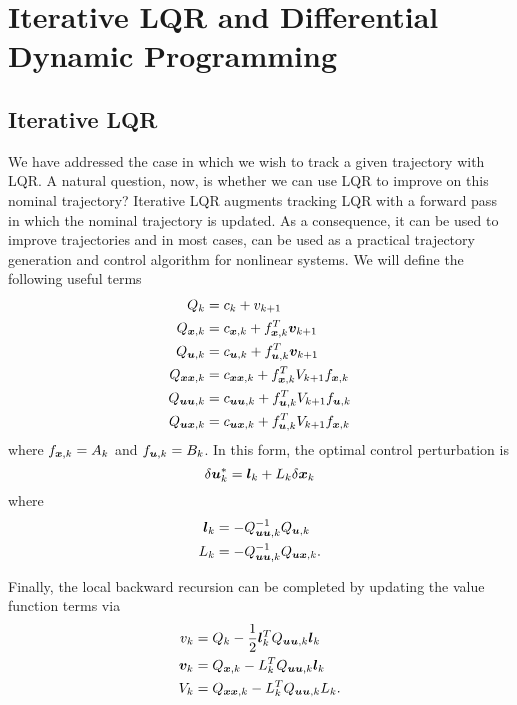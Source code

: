 \section{Iterative LQR and Differential Dynamic Programming}

\subsection{Iterative LQR}

We have addressed the case in which we wish to track a given trajectory with LQR. A natural question, now, is whether we can use LQR to improve on this nominal trajectory? Iterative LQR augments tracking LQR with a forward pass in which the nominal trajectory is updated. As a consequence, it can be used to improve trajectories and in most cases, can be used as a practical trajectory generation and control algorithm for nonlinear systems. We will define the following useful terms
\begin{align}
\label{eq:Qk}
    Q_k &= c_k + v_{k+1}\\
    Q_{\bm{x},k} &= c_{\bm{x},k} + f_{\bm{x},k}^T \bm{v}_{k+1}\\
    Q_{\bm{u},k} &= c_{\bm{u},k} + f_{\bm{u},k}^T \bm{v}_{k+1}\\
    Q_{\bm{x} \bm{x},k} &= c_{\bm{x} \bm{x},k} + f_{\bm{x},k}^T V_{k+1} f_{\bm{x},k} \label{eq:Qxxk}\\
    Q_{\bm{u} \bm{u},k} &= c_{\bm{u} \bm{u},k} + f_{\bm{u},k}^T V_{k+1} f_{\bm{u},k}\\
    Q_{\bm{u} \bm{x},k} &= c_{\bm{u} \bm{x},k} + f_{\bm{u},k}^T V_{k+1} f_{\bm{x},k} \label{eq:Quxk}
\end{align}
where $f_{\bm{x},k} = A_k$ and $f_{\bm{u},k} = B_k$. In this form, the optimal control perturbation is
\begin{equation}
    \delta \bm{u}_k^* = \bm{l}_k + L_k \delta \bm{x}_k
\end{equation}
where 
\begin{align}
    \label{eq:iLQR_fb1}
    \bm{l}_k &= - Q_{\bm{u} \bm{u},k}^{-1} Q_{\bm{u},k}\\
    L_k &= - Q_{\bm{u} \bm{u},k}^{-1} Q_{\bm{u} \bm{x},k}. \label{eq:iLQR_fb2}
\end{align}

Finally, the local backward recursion can be completed by updating the value function terms via
\begin{align}
    \label{eq:iLQR_V1}
    v_k &= Q_k - \frac{1}{2} \bm{l}_k^T Q_{\bm{u} \bm{u}, k} \bm{l}_k\\
    \bm{v}_{k} &= Q_{\bm{x},k} - L_k^T Q_{\bm{u} \bm{u}, k} \bm{l}_k\\
    V_{k} &= Q_{\bm{x} \bm{x},k} - L_k^T Q_{\bm{u} \bm{u}, k} L_k. \label{eq:iLQR_V3}
\end{align}

